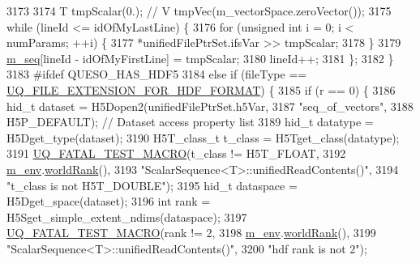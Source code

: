 \begin{DoxyCode}
3173 
3174             T tmpScalar(0.); \textcolor{comment}{// V tmpVec(m\_vectorSpace.zeroVector());}
3175             \textcolor{keywordflow}{while} (lineId <= idOfMyLastLine) \{
3176               \textcolor{keywordflow}{for} (\textcolor{keywordtype}{unsigned} \textcolor{keywordtype}{int} i = 0; i < numParams; ++i) \{
3177                 *unifiedFilePtrSet.ifsVar >> tmpScalar;
3178               \}
3179               \hyperlink{class_q_u_e_s_o_1_1_scalar_sequence_ae616036fd2e62fb69df167814545e893}{m\_seq}[lineId - idOfMyFirstLine] = tmpScalar;
3180               lineId++;
3181             \};
3182           \}
3183 \textcolor{preprocessor}{#ifdef QUESO\_HAS\_HDF5}
3184 \textcolor{preprocessor}{}          \textcolor{keywordflow}{else} \textcolor{keywordflow}{if} (fileType == \hyperlink{_defines_8h_a4ebcc075277d031eb97c90b9a45f4493}{UQ\_FILE\_EXTENSION\_FOR\_HDF\_FORMAT}) \{
3185             \textcolor{keywordflow}{if} (r == 0) \{
3186               hid\_t dataset = H5Dopen2(unifiedFilePtrSet.h5Var,
3187                                        \textcolor{stringliteral}{"seq\_of\_vectors"},
3188                                        H5P\_DEFAULT); \textcolor{comment}{// Dataset access property list }
3189               hid\_t datatype  = H5Dget\_type(dataset);
3190               H5T\_class\_t t\_class = H5Tget\_class(datatype);
3191               \hyperlink{_defines_8h_a56d63d18d0a6d45757de47fcc06f574d}{UQ\_FATAL\_TEST\_MACRO}(t\_class != H5T\_FLOAT,
3192                                   \hyperlink{class_q_u_e_s_o_1_1_scalar_sequence_a71618cd6351b29361b437af68447a4c8}{m\_env}.\hyperlink{class_q_u_e_s_o_1_1_base_environment_a78b57112bbd0e6dd0e8afec00b40ffa7}{worldRank}(),
3193                                   \textcolor{stringliteral}{"ScalarSequence<T>::unifiedReadContents()"},
3194                                   \textcolor{stringliteral}{"t\_class is not H5T\_DOUBLE"});
3195               hid\_t dataspace = H5Dget\_space(dataset);
3196               \textcolor{keywordtype}{int}   rank      = H5Sget\_simple\_extent\_ndims(dataspace);
3197               \hyperlink{_defines_8h_a56d63d18d0a6d45757de47fcc06f574d}{UQ\_FATAL\_TEST\_MACRO}(rank != 2,
3198                                   \hyperlink{class_q_u_e_s_o_1_1_scalar_sequence_a71618cd6351b29361b437af68447a4c8}{m\_env}.\hyperlink{class_q_u_e_s_o_1_1_base_environment_a78b57112bbd0e6dd0e8afec00b40ffa7}{worldRank}(),
3199                                   \textcolor{stringliteral}{"ScalarSequence<T>::unifiedReadContents()"},
3200                                   \textcolor{stringliteral}{"hdf rank is not 2"});

\end{DoxyCode}
